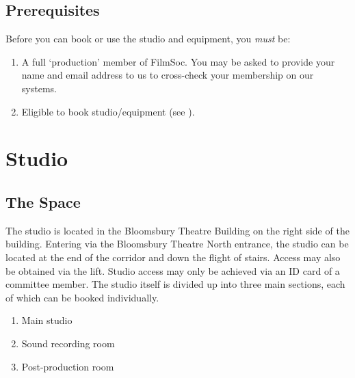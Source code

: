 \documentclass[]{article}
\begin{document}
\subsection{Prerequisites}
Before you can book or use the studio and equipment, you \textit{must} be:
\begin{enumerate}
    \item A full `production' member of FilmSoc. You may be asked to provide your name and email address to us to cross-check your membership on our systems.
    \item Eligible to book studio/equipment (see ).
\end{enumerate}
\section{Studio}
\subsection{The Space}\label{studioSpaces}
The studio is located in the Bloomsbury Theatre Building on the right side of the building. Entering via the Bloomsbury Theatre North entrance, the studio can be located at the end of the corridor and down the flight of stairs. Access may also be obtained via the lift. Studio access may only be achieved via an ID card of a committee member. The studio itself is divided up into three main sections, each of which can be booked individually.
\begin{enumerate}
    \item Main studio
    \item Sound recording room
    \item Post-production room
\end{enumerate}
\end{document}
